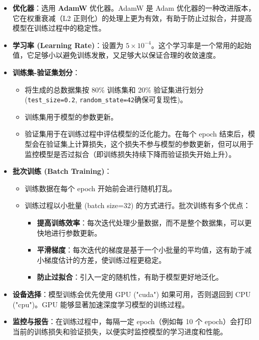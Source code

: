 \begin{itemize}
    \item \textbf{优化器}：选用 \textbf{AdamW} 优化器。AdamW 是 Adam 优化器的一种改进版本，它在权重衰减（L2 正则化）的处理上更为有效，有助于防止过拟合，并提高模型在训练过程中的稳定性。
    \item \textbf{学习率 (Learning Rate)}：设置为 $5 \times 10^{-4}$。这个学习率是一个常用的起始值，它足够小以避免训练发散，又足够大以保证合理的收敛速度。
    \item \textbf{训练集-验证集划分}：
        \begin{itemize}
            \item 将生成的总数据集按 80\% 训练集和 20\% 验证集进行划分 (\texttt{test\_size=0.2}, \texttt{random\_state=42}确保可复现性)。
            \item 训练集用于模型的参数更新。
            \item 验证集用于在训练过程中评估模型的泛化能力。在每个 epoch 结束后，模型会在验证集上计算损失，这个损失不参与模型的参数更新，但可以用于监控模型是否过拟合（即训练损失持续下降而验证损失开始上升）。
        \end{itemize}
    \item \textbf{批次训练 (Batch Training)}：
        \begin{itemize}
            \item 训练数据在每个 epoch 开始前会进行随机打乱。
            \item 训练过程以小批量 (batch size=32) 的方式进行。批次训练有多个优点：
                \begin{itemize}
                    \item \textbf{提高训练效率}：每次迭代处理少量数据，而不是整个数据集，可以更快地进行参数更新。
                    \item \textbf{平滑梯度}：每次迭代的梯度是基于一个小批量的平均值，这有助于减小梯度估计的方差，使训练过程更稳定。
                    \item \textbf{防止过拟合}：引入一定的随机性，有助于模型更好地泛化。
                \end{itemize}
        \end{itemize}
    \item \textbf{设备选择}：模型训练会优先使用 GPU ("cuda") 如果可用，否则退回到 CPU ("cpu")。GPU 能够显著加速深度学习模型的训练过程。
    \item \textbf{监控与报告}：在训练过程中，每隔一定 epoch（例如每 10 个 epoch）会打印当前的训练损失和验证损失，以便实时监控模型的学习进度和性能。
\end{itemize}

